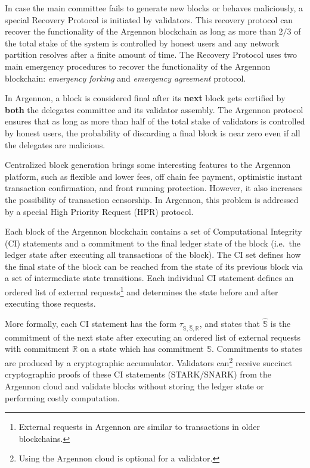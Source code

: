 In case the main committee fails to generate new blocks or behaves maliciously, a special Recovery Protocol is
initiated by validators.
This recovery protocol can recover the functionality
of the Argennon blockchain as long as more than $2/3$ of the total stake of the system is controlled by honest users
and any network partition resolves after a finite amount of time. The Recovery Protocol uses two main emergency
procedures to recover the functionality of the Argennon blockchain: \emph{emergency forking} and \emph{emergency
agreement} protocol.

In Argennon, a block is considered final after its \textbf{next} block gets certified by \textbf{both} the
delegates committee and its validator assembly.
The Argennon protocol ensures that as long as more than half of the total stake of validators is
controlled by honest users, the probability of discarding a final block is near zero even if all the delegates are
malicious.

Centralized block generation brings some interesting features to the Argennon platform, such as flexible and lower
fees, off chain fee payment, optimistic instant transaction confirmation, and front running protection.
However, it also increases the possibility of transaction censorship. In Argennon, this problem is addressed by a
special High Priority Request (HPR) protocol.

Each block of the Argennon blockchain contains a set of Computational Integrity (CI) statements and a commitment to
the final ledger state of the block (i.e.\ the ledger state after executing all transactions of the block). The CI
set defines how the final state of the block can be reached from
the state of its previous block via a set of intermediate state transitions. Each individual CI statement defines
an ordered list of external requests\footnote{External requests in Argennon are
similar to transactions in older blockchains.} and determines the state before and after executing those requests.

More formally, each CI statement has the form $\tau_{\mathbb{S}, \hat{\mathbb{S}}, \mathbb{R}}$, and states that
$\hat{\mathbb{S}}$ is the commitment of the next state after executing an ordered list of external requests with
commitment $\mathbb{R}$ on a state which has commitment $\mathbb{S}$.
Commitments to states are produced by a cryptographic accumulator.
Validators can\footnote{Using the Argennon cloud is optional for a validator.} receive succinct cryptographic proofs
of these CI statements (STARK/SNARK) from the Argennon cloud and validate blocks without storing the ledger state
or performing costly computation.

